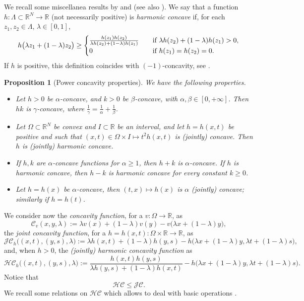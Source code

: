\documentclass[11pt, reqno]{amsart}
\newtheorem{proposition}[lemma]{Proposition}
\theoremstyle{definition}
\numberwithin{equation}{section}
\newcommand{\R}{\mathbb{R}}
\newcommand{\mc}[1]{\mathcal{#1}}
\begin{document}
We recall some miscellanea results by \cite[Properties 7 and 8, Lemma A.2]{Ken85} and \cite[Lemma 3.2]{Ken88} (see also \cite[Theorems 1 and 3, Corollary 2]{Lin81}). 
We say that a function $h: \Lambda\subset \R^N \to \R$ (not necessarily positive) is \emph{harmonic concave} if, for each $z_1,z_2 \in \Lambda$, $\lambda \in [0,1]$, 
$$ h\big(\lambda z_1 + (1-\lambda)z_2 \big) \geq \begin{cases}
\frac{h(z_1) h(z_2)}{\lambda h(z_2) + (1-\lambda) h(z_1)} &\quad \hbox{if $\lambda h(z_2) + (1-\lambda) h(z_1)>0$}, \\
 0 &\quad \hbox{if $h(z_1)=h(z_2)=0$}.
\end{cases}$$
If $h$ is positive, this definition coincides with $(-1)$-concavity, see \cite{Ken85}.

\begin{proposition}[Power concavity properties]
\label{prop_propriet_concav_varie}
We have the following properties.
\begin{itemize}
\item Let $h>0$ be $\alpha$-concave, and $k>0$ be $\beta$-concave, with $\alpha, \beta \in [0,+\infty]$. Then $hk$ is $\gamma$-concave, where $\frac{1}{\gamma}=\frac{1}{\alpha}+\frac{1}{\beta}$.
\item Let $\Omega \subset \R^N$ be convex and $I\subset \R$ be an interval, and let $h=h(x,t)$ be positive and such that $(x,t) \in \Omega \times I \mapsto t^2 h(x,t)$ is (jointly) concave. Then $h$ is (jointly) harmonic concave.
 \item If $h,k$ are $\alpha$-concave functions for $\alpha \geq 1$, then $h+k$ is $\alpha$-concave. 
 If $h$ is harmonic concave, then $h-k$ is harmonic concave for every constant $k\geq 0$.
 \item Let $h=h(x)$ be $\alpha$-concave, then $(t,x) \mapsto h(x)$ is $\alpha$ (jointly) concave; similarly if $h=h(t)$.
 \end{itemize}
\end{proposition}

\smallskip

We consider now the \emph{concavity function}, for a $v:\Omega \to \R$, as 
$$\mc{C}_{v}(x,y,\lambda):= \lambda v(x) + (1-\lambda) v(y) - v\big( \lambda x + (1-\lambda) y\big),$$
the \emph{joint concavity function}, for a $h=h(x,t): \Omega \times \R \to \R$, as
$$\mc{JC}_{h}\big((x,t),(y,s),\lambda\big):= \lambda h(x,t) + (1-\lambda) h(y,s) - h\big(\lambda x + (1-\lambda)y, \lambda t + (1-\lambda)s \big),$$
and, when $h>0$, the \emph{(jointly) harmonic concavity function} as
$$\mc{HC}_{h}\big((x,t),(y,s),\lambda\big):=\frac{h(x,t) h(y,s)}{\lambda h(y,s) + (1-\lambda) h(x,t)} - h\big(\lambda x + (1-\lambda)y, \lambda t + (1-\lambda)s \big).$$
Notice that \cite{BuSq20} 
$$\mc{HC} \leq \mc{JC}.$$
We recall some relations on $\mc{HC}$ which allows to deal with basic operations \cite[Lemma A.1]{BuSq20}.
\end{document}
